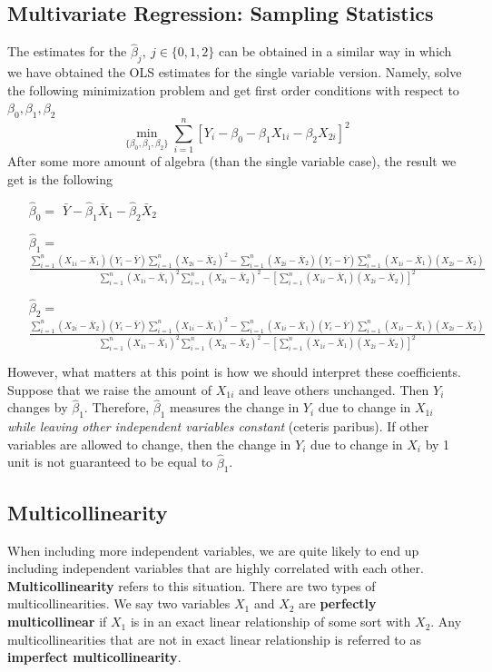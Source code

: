 \documentclass[12pt]{article}
\theoremstyle{definition}
\theoremstyle{property}
\theoremstyle{assumption}
\theoremstyle{example}
\theoremstyle{comment}
\begin{document}
\subsection{Multivariate Regression: Sampling Statistics}
The estimates for the $\hat{\beta}_j, \ j\in\{0,1,2\}$ can be obtained in a similar way in which we have obtained the OLS estimates for the single variable version. Namely, solve the following minimization problem and get first order conditions with respect to $\beta_0, \beta_1, \beta_2$
\[
\min_{\{\beta_0,\beta_1,\beta_2\}} \sum_{i=1}^n[Y_i-\beta_0 - \beta_1X_{1i}-\beta_2X_{2i}]^2
\]
After some more amount of algebra (than the single variable case), the result we get is the following
\begin{itemize}
\item[$\hat{\beta}_0=$] $\bar{Y}-\hat{\beta}_1\bar{X}_1-\hat{\beta}_2\bar{X}_2$
\item[$\hat{\beta}_1=$] $\frac{\sum_{i=1}^n (X_{1i}-\bar{X}_1)(Y_{i}-\bar{Y})\sum_{i=1}^n(X_{2i}-\bar{X}_2)^2-\sum_{i=1}^n (X_{2i}-\bar{X}_2)(Y_{i}-\bar{Y})\sum_{i=1}^n(X_{1i}-\bar{X}_1)(X_{2i}-\bar{X}_2)}{\sum_{i=1}^n (X_{1i}-\bar{X}_1)^2\sum_{i=1}^n (X_{2i}-\bar{X}_2)^2-[\sum_{i=1}^n (X_{1i}-\bar{X}_1)(X_{2i}-\bar{X}_2)]^2}$
\item[$\hat{\beta}_2=$] $\frac{\sum_{i=1}^n (X_{2i}-\bar{X}_2)(Y_{i}-\bar{Y})\sum_{i=1}^n(X_{1i}-\bar{X}_1)^2-\sum_{i=1}^n (X_{1i}-\bar{X}_1)(Y_{i}-\bar{Y})\sum_{i=1}^n(X_{1i}-\bar{X}_1)(X_{2i}-\bar{X}_2)}{\sum_{i=1}^n (X_{1i}-\bar{X}_1)^2\sum_{i=1}^n (X_{2i}-\bar{X}_2)^2-[\sum_{i=1}^n (X_{1i}-\bar{X}_1)(X_{2i}-\bar{X}_2)]^2}$
\end{itemize} \par\medskip
However, what matters at this point is how we should interpret these coefficients. Suppose that we raise the amount of $X_{1i}$ and leave others unchanged. Then $Y_i$ changes by $\hat{\beta}_1$. Therefore, $\hat{\beta}_1$ measures the change in $Y_i$ due to change in $X_{1i}$ \emph{while leaving other independent variables constant} (ceteris paribus). If other variables are allowed to change, then the change in $Y_i$ due to change in $X_i$ by 1 unit is not guaranteed to be equal to $\hat{\beta}_1$.

\subsection{Multicollinearity}
When including more independent variables, we are quite likely to end up including independent variables that are highly correlated with each other. \textbf{Multicollinearity} refers to this situation. There are two types of multicollinearities. We say two variables $X_1$ and $X_2$ are \textbf{perfectly multicollinear} if $X_1$ is in an exact linear relationship of some sort with $X_2$. Any multicollinearities that are not in exact linear relationship is referred to as \textbf{imperfect multicollinearity}. \par\medskip
\end{document}
